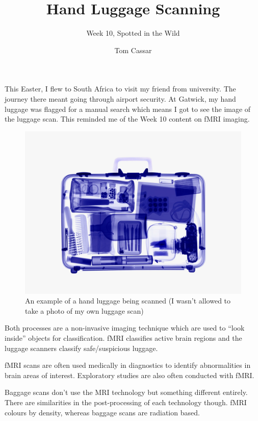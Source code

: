 \documentclass[fontsize=12]{article}
\title{Hand Luggage Scanning}
\author{Week 10, Spotted in the Wild}
\date{Tom Cassar}
\begin{document}
\maketitle

This Easter, I flew to South Africa to visit my friend from university. The
journey there meant going through airport security. At Gatwick, my hand luggage
was flagged for a manual search which means I got to see the image of the
luggage scan. This reminded me of the Week 10 content on fMRI imaging.

\begin{figure}[H]
    \centering
    \includegraphics[width=0.6 \linewidth]{./img/suitcasescan-TA.png} 
    \caption{An example of a hand luggage being scanned (I wasn't allowed to
    take a photo of my own luggage scan)}\label{fig:illusion}
\end{figure}

Both processes are a non-invasive imaging technique which are used to ``look
inside'' objects for classification. fMRI classifies active brain regions and
the luggage scanners classify safe/suspicious luggage.

fMRI scans are often used medically in diagnostics to identify abnormalities in
brain areas of interest. Exploratory studies are also often conducted with fMRI.

Baggage scans don't use the MRI technology but something different entirely.
There are similarities in the post-processing of each technology though. fMRI
colours by density, whereas baggage scans are radiation based.
\end{document}
